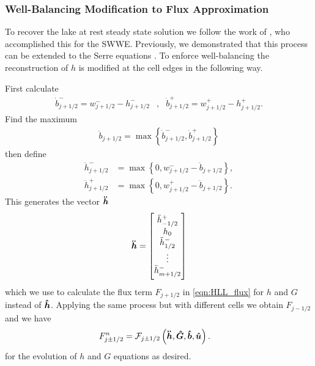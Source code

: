 \subsubsection{Well-Balancing Modification to Flux Approximation}
To recover the lake at rest steady state solution we follow the work of \citet{Klein-etal-2004-2050}, who accomplished this for the SWWE. Previously, we demonstrated that this process can be extended to the Serre equations \cite{Pitt-J-2014}. To enforce well-balancing the reconstruction of $h$ is modified at the cell edges in the following way.

First calculate
\begin{align}
\dot{b}^-_{j+1/2} = w^-_{j+1/2} - h^-_{j+1/2} &, &\dot{b}^+_{j+1/2} = w^+_{j+1/2} - h^+_{j+1/2}.
\label{eqn:BedReDefWmH}
\end{align}
Find the maximum
\begin{align*}
\ddot{b}_{j+1/2} = \max\left\lbrace\dot{b}^-_{j+1/2} , \dot{b}^+_{j+1/2} \right\rbrace
\end{align*}
then define
\begin{subequations}
\begin{align}
\ddot{h}^-_{j+1/2} &= \max\left\lbrace 0, w^-_{j+1/2} - \ddot{b}_{j+1/2}  \right\rbrace, \\  \ddot{h}^+_{j+1/2} &= \max\left\lbrace 0, w^+_{j+1/2} - \ddot{b}_{j+1/2} \right\rbrace.
\end{align}
\label{eqn:ModifiedHValue}
\end{subequations}
This generates the vector $\boldsymbol{\ddot{h}}$
\begin{equation*}
\vecn{\ddot{h}}= \begin{bmatrix} \TM
\ddot{h}^+_{-1/2} \\ h_0 \\ \ddot{h}^-_{1/2} \\ \vdots  \\ \ddot{h}^-_{m + 1/2}  \BM \end{bmatrix}
\end{equation*}
which we use to calculate the flux term $F_{j+1/2}$ in \eqref{eqn:HLL_flux} for $h$ and $G$ instead of $\boldsymbol{\hat{h}}$. Applying the same process but with different cells we obtain $F_{j-1/2}$ and we have
\begin{align*}	
F^n_{j\pm 1/2} &=\mathcal{F}_{j\pm1/2} \left(\boldsymbol{\ddot{h}}, \boldsymbol{\hat{G}},\boldsymbol{\hat{b}}, \boldsymbol{\hat{u}}  \right).
\end{align*}
for the evolution of $h$ and $G$ equations as desired.

